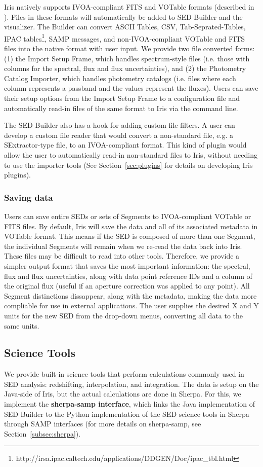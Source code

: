 Iris natively supports IVOA-compliant FITS and VOTable formats (described in \cite{2012arXiv1204.3055M}). Files in these formats will automatically be added to SED Builder and the visualizer. The Builder can convert ASCII Tables, CSV, Tab-Seprated-Tables, IPAC tables\footnote{http://irsa.ipac.caltech.edu/applications/DDGEN/Doc/ipac\_tbl.html}, SAMP messages, and non-IVOA-compliant VOTable and FITS files into the native format with user input. We provide two file converted forms: (1) the Import Setup Frame, which handles spectrum-style files (i.e. those with columns for the spectral, flux and flux uncertainties), and (2) the Photometry Catalog Importer, which handles photometry catalogs (i.e. files where each column represents a passband and the values represent the fluxes). Users can save their setup options from the Import Setup Frame to a configuration file and automatically read-in files of the same format to Iris via the command line.

The SED Builder also has a hook for adding custom file filters. A user can develop a custom file reader that would convert a non-standard file, e.g. a SExtractor-type file, to an IVOA-compliant format. This kind of plugin would allow the user to automatically read-in non-standard files to Iris, without needing to use the importer tools (See Section~\ref{sec:plugins} for details on developing Iris plugins).

\subsubsection{Saving data}
Users can save entire SEDs or sets of Segments to IVOA-compliant VOTable or FITS files. By default, Iris will save the data and all of its associated metadata in VOTable format. This means if the SED is composed of more than one Segment, the individual Segments will remain when we re-read the data back into Iris. These files may be difficult to read into other tools. Therefore, we provide a simpler output format that saves the most important information: the spectral, flux and flux uncertainties, along with data point reference IDs and a column of the original flux (useful if an aperture correction was applied to any point). All Segment distinctions dissappear, along with the metadata, making the data more compliable for use in external applications. The user supplies the desired X and Y units for the new SED from the drop-down menus, converting all data to the same units.

\subsection{Science Tools}
We provide built-in science tools that perform calculations commonly used in SED analysis: redshifting, interpolation, and integration. The data is setup on the Java-side of Iris, but the actual calculations are done in Sherpa. For this, we implement the \textbf{sherpa-samp interface}, which links the Java implementation of SED Builder to the Python implementation of the SED science tools in Sherpa through SAMP interfaces (for more details on sherpa-samp, see Section~\ref{subsec:sherpa}).

